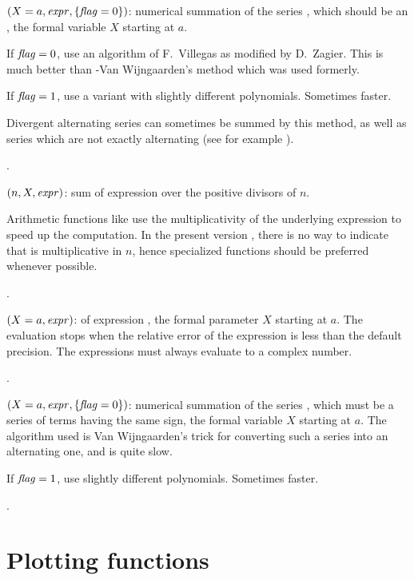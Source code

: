 $(X=a,\hbox{\it expr\/},\{\hbox{\it f\kern0pt lag\/}=0\})$: numerical summation of the
series , which should be an , the formal
variable $X$ starting at $a$.

If $\hbox{\it f\kern0pt lag\/}=0$, use an algorithm of F.~Villegas as modified by D.~Zagier. This
is much better than -Van Wijngaarden's method which was used
formerly.

If $\hbox{\it f\kern0pt lag\/}=1$, use a variant with slightly different polynomials. Sometimes
faster.

Divergent alternating series can sometimes be summed by this method, as well
as series which are not exactly alternating (see for example
).

.

$(n,X,\hbox{\it expr\/})$: sum of expression  over
the positive divisors of $n$.

Arithmetic functions like  use the multiplicativity of the
underlying expression to speed up the computation. In the present version
\vers, there is no way to indicate that  is multiplicative in
$n$, hence specialized functions should be preferred whenever possible.

.

$(X=a,\hbox{\it expr\/})$:  of expression
, the formal parameter $X$ starting at $a$. The evaluation stops
when the relative error of the expression is less than the default precision.
The expressions must always evaluate to a complex number.

.

$(X=a,\hbox{\it expr\/},\{\hbox{\it f\kern0pt lag\/}=0\})$: numerical summation of the
series , which must be a series of terms having the same sign,
the formal
variable $X$ starting at $a$. The algorithm used is Van Wijngaarden's trick
for converting such a series into an alternating one, and is quite slow.

If $\hbox{\it f\kern0pt lag\/}=1$, use slightly different polynomials. Sometimes faster.

.

\section{Plotting functions}


